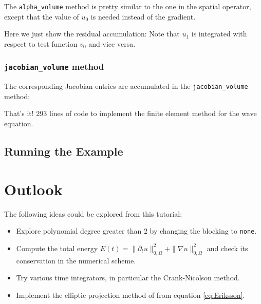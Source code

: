 \documentclass[a4paper,12pt]{article}
\theoremstyle{definition}
\theoremstyle{definition}
\begin{document}
The \lstinline{alpha_volume} method is pretty similar
to the one in the spatial operator, except that the value of $u_0$
is needed instead of the gradient.

Here we just show the residual accumulation:
%
Note that $u_1$ is integrated with respect to test function $v_0$
and vice versa.

\subsubsection*{\lstinline{jacobian_volume} method}

The corresponding Jacobian entries are accumulated in the
\lstinline{jacobian_volume} method:
%

That's it! 293 lines of code to implement the finite element method for
the wave equation.

\subsection{Running the Example}



\section{Outlook}

The following ideas could be explored from this tutorial:
\begin{itemize}
\item Explore polynomial degree greater than $2$ by changing the blocking
to \lstinline{none}.
\item Compute the total energy $E(t) = \|\partial_t u\|_{0,\Omega}^2 +
  \|\nabla u\|_{0,\Omega}^2$ and check its conservation in
the numerical scheme.
\item Try various time integrators, in particular the Crank-Nicolson method.
\item Implement the elliptic projection method of \cite{Eriksson} from
equation \eqref{eq:Eriksson}.
\end{itemize}



\end{document}

